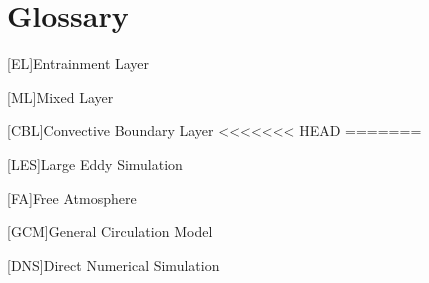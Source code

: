
\chapter{Glossary}







\begin{acronym}
[EL]{Entrainment Layer}
\end{acronym}

\begin{acronym}
[ML]{Mixed Layer}
\end{acronym}

\begin{acronym}
[CBL]{Convective Boundary Layer}
<<<<<<< HEAD
=======
\end{acronym}

\begin{acronym}
[LES]{Large Eddy Simulation}
\end{acronym}

\begin{acronym}
[FA]{Free Atmosphere}
\end{acronym}

\begin{acronym}
[GCM]{General Circulation Model}
\end{acronym}

\begin{acronym}
[DNS]{Direct Numerical Simulation}
\end{acronym}



